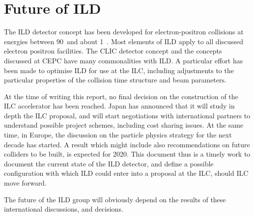 \chapter{Future of ILD}
\label{chap:future}

The ILD detector concept has been developed for electron-positron collisions at energies between 90~\GeV and about 1~\TeV. Most elements of ILD apply to all discussed electron positron facilities. The CLIC detector concept and the concepts discussed at CEPC have many commonalities with ILD. A particular effort has been made to optimise ILD for use at the ILC, including adjustments to the particular properties of the collision time structure and beam parameters. 

At the time of writing this report, no final decision on the construction of the ILC accelerator has been reached. Japan has announced that it will study in depth the ILC proposal, and will start negotiations with international partners to understand possible project schemes, including cost sharing issues. At the same time, in Europe, the discussion on the particle physics strategy for the next decade has started. A result which might include also recommendations on future colliders to be built, is expected for 2020. This document thus is a timely work to document the current state of the ILD detector, and define a possible configuration with which ILD could enter into a proposal at the ILC, should ILC move forward. 

The future of the ILD group will obviously depend on the results of these international discussions, and decisions. 